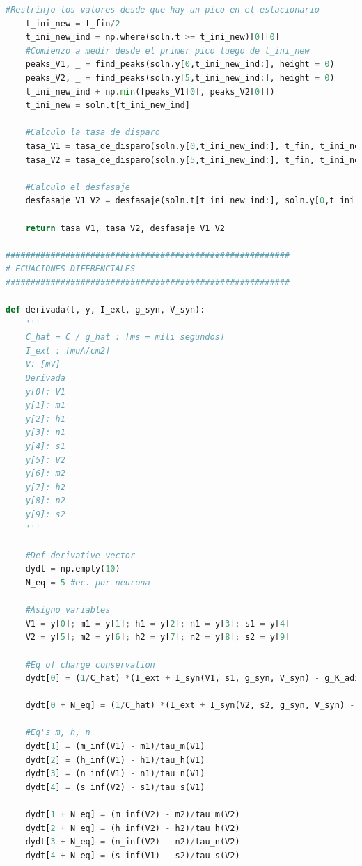 \documentclass[aps,prb,twocolumn,superscriptaddress,floatfix,longbibliography]{revtex4-2}
\begin{document}
\begin{lstlisting}[language=Python]
    #Restrinjo los valores desde que hay un pico en el estacionario
    t_ini_new = t_fin/2
    t_ini_new_ind = np.where(soln.t >= t_ini_new)[0][0]
    #Comienzo a medir desde el primer pico luego de t_ini_new
    peaks_V1, _ = find_peaks(soln.y[0,t_ini_new_ind:], height = 0)
    peaks_V2, _ = find_peaks(soln.y[5,t_ini_new_ind:], height = 0)
    t_ini_new_ind + np.min([peaks_V1[0], peaks_V2[0]])
    t_ini_new = soln.t[t_ini_new_ind]

    #Calculo la tasa de disparo
    tasa_V1 = tasa_de_disparo(soln.y[0,t_ini_new_ind:], t_fin, t_ini_new)
    tasa_V2 = tasa_de_disparo(soln.y[5,t_ini_new_ind:], t_fin, t_ini_new)

    #Calculo el desfasaje
    desfasaje_V1_V2 = desfasaje(soln.t[t_ini_new_ind:], soln.y[0,t_ini_new_ind:], soln.y[5,t_ini_new_ind:])

    return tasa_V1, tasa_V2, desfasaje_V1_V2

#########################################################
# ECUACIONES DIFERENCIALES
#########################################################

def derivada(t, y, I_ext, g_syn, V_syn):
    '''
    C_hat = C / g_hat : [ms = mili segundos]
    I_ext : [muA/cm2]
    V: [mV]
    Derivada
    y[0]: V1
    y[1]: m1
    y[2]: h1
    y[3]: n1
    y[4]: s1
    y[5]: V2
    y[6]: m2
    y[7]: h2
    y[8]: n2
    y[9]: s2
    '''

    #Def derivative vector
    dydt = np.empty(10)
    N_eq = 5 #ec. por neurona

    #Asigno variables
    V1 = y[0]; m1 = y[1]; h1 = y[2]; n1 = y[3]; s1 = y[4]
    V2 = y[5]; m2 = y[6]; h2 = y[7]; n2 = y[8]; s2 = y[9]

    #Eq of charge conservation
    dydt[0] = (1/C_hat) *(I_ext + I_syn(V1, s1, g_syn, V_syn) - g_K_adim*n1**4*(V1 - V_K) - g_Na_adim*m1**3*h1*(V1 - V_Na) - g_L_adim*(V1 - V_L))

    dydt[0 + N_eq] = (1/C_hat) *(I_ext + I_syn(V2, s2, g_syn, V_syn) - g_K_adim*n2**4*(V2 - V_K) - g_Na_adim*m2**3*h2*(V2 - V_Na) - g_L_adim*(V2 - V_L))

    #Eq's m, h, n
    dydt[1] = (m_inf(V1) - m1)/tau_m(V1)
    dydt[2] = (h_inf(V1) - h1)/tau_h(V1)
    dydt[3] = (n_inf(V1) - n1)/tau_n(V1)
    dydt[4] = (s_inf(V2) - s1)/tau_s(V1)

    dydt[1 + N_eq] = (m_inf(V2) - m2)/tau_m(V2)
    dydt[2 + N_eq] = (h_inf(V2) - h2)/tau_h(V2)
    dydt[3 + N_eq] = (n_inf(V2) - n2)/tau_n(V2)
    dydt[4 + N_eq] = (s_inf(V1) - s2)/tau_s(V2)


\end{lstlisting}
\end{document}

